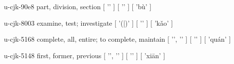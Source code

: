 \begin{multicols}{2}
\lettrine[lines=3]{\cjkgGlue{}}{}\begin{minipage}{0.8\linewidth} u-cjk-90e8  part, division, section  [ '\cjkgGlue{}' ]  [ '\cjkgGlue{}' ]  [ 'bù' ] \end{minipage}

\lettrine[lines=3]{\cjkgGlue{}}{}\begin{minipage}{0.8\linewidth} u-cjk-8003  examine, test; investigate  [ '\cjkgGlue{}(\cjkgGlue{}|\cjkgGlue{})' ]  [ '\cjkgGlue{}' ]  [ 'kǎo' ] \end{minipage}

\lettrine[lines=3]{\cjkgGlue{}}{}\begin{minipage}{0.8\linewidth} u-cjk-5168  complete, all, entire; to complete, maintain  [ '\cjkgGlue{}', '\cjkgGlue{}' ]  [ '\cjkgGlue{}' ]  [ 'quán' ] \end{minipage}

\lettrine[lines=3]{\cjkgGlue{}}{}\begin{minipage}{0.8\linewidth} u-cjk-5148  first, former, previous  [ '\cjkgGlue{}', '\cjkgGlue{}' ]  [ '\cjkgGlue{}' ]  [ 'xiān' ] \end{minipage}


\end{multicols}
